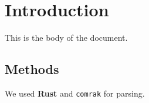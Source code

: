 \section{Introduction}\label{introduction}
This is the body of the document.

\subsection{Methods}\label{methods}
We used \textbf{Rust} and \texttt{comrak} for parsing.

